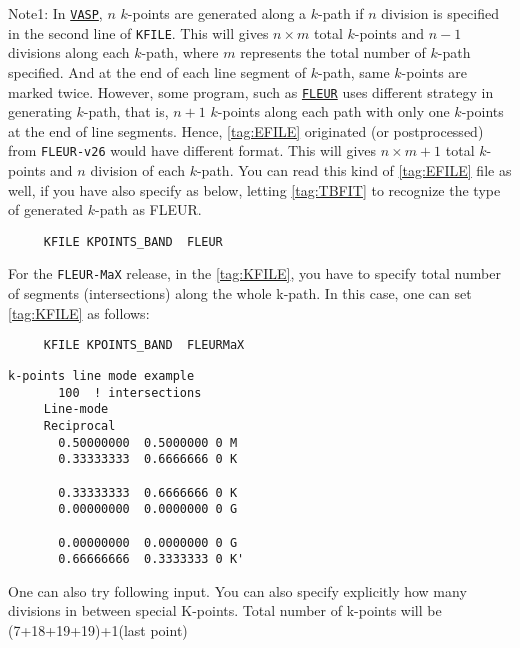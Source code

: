 \documentclass[a4paper,12pt]{scrartcl}
\begin{document}
\begin{description}
    Note1: In \href{https://www.vasp.at}{\texttt{VASP}}, $n$ $k$-points are generated along a $k$-path if $n$ 
    division is specified in the second line of \texttt{KFILE}. This will gives $n \times m$ total $k$-points and $n-1$ divisions along each $k$-path, where $m$ represents the total number of $k$-path specified. And at the end of each line segment of $k$-path, same $k$-points are marked twice. 
    However, some program, 
    such as \href{http://www.flapw.de}{\texttt{FLEUR}} uses different strategy 
    in generating $k$-path, that is, 
    $n+1$ $k$-points along each path with only one $k$-points at the end
    of line segments. Hence, \ref{tag:EFILE} originated (or postprocessed) 
    from \texttt{FLEUR-v26} would have different format.
    This will gives $n \times m + 1$ total $k$-points and $n$ division of 
    each $k$-path. You can read this kind of \ref{tag:EFILE} file as well, if you have 
    also specify as below, letting \ref{tag:TBFIT} to recognize the type of 
    generated $k$-path as FLEUR.
    
     \begin{verbatim}
     KFILE KPOINTS_BAND  FLEUR
     \end{verbatim}
    
    For the \texttt{FLEUR-MaX} release, in the \ref{tag:KFILE}, you have to specify total number of segments (intersections) along the whole k-path. In this case, one can set \ref{tag:KFILE} as follows:
    
     \begin{verbatim}
     KFILE KPOINTS_BAND  FLEURMaX
     \end{verbatim}
         \begin{Verbatim}[commandchars=\\\{\},gobble=4, frame=single, framesep=2mm, 
            label= KPOINTS\_BAND $line$ $mode$ example with FLEURMaX tag, 
            labelposition=bottomline]
     k-points line mode example
       100  ! intersections
     Line-mode
     Reciprocal
       0.50000000  0.5000000 0 M
       0.33333333  0.6666666 0 K
       
       0.33333333  0.6666666 0 K
       0.00000000  0.0000000 0 G
       
       0.00000000  0.0000000 0 G
       0.66666666  0.3333333 0 K'
        \end{Verbatim}

	One can also try following input. You can also specify explicitly how many divisions in between special K-points. Total number of k-points will be (7+18+19+19)+1(last point)


\end{description}
\end{document}
